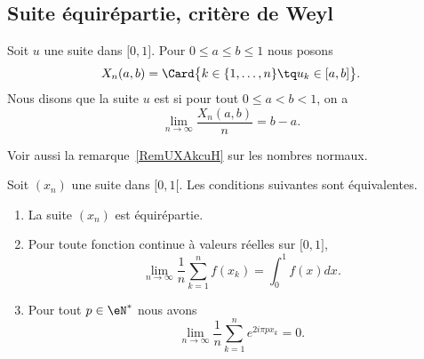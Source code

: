 \subsection{Suite équirépartie, critère de Weyl}

\begin{definition}
    Soit \( u\) une suite dans \( \mathopen[ 0 , 1 \mathclose]\). Pour \( 0\leq a\leq b\leq 1\) nous posons
    \begin{equation}
        X_n(a,b)=\Card\big\{  k\in\{ 1,\ldots, n \}\tq u_k\in\mathopen[ a , b \mathclose] \big\}.
    \end{equation}
    Nous disons que la suite \( u\) est  si pour tout \( 0\leq a<b<1\), on a
    \begin{equation}
        \lim_{n\to \infty} \frac{ X_n(a,b) }{ n }=b-a.
    \end{equation}
\end{definition}
Voir aussi la remarque~\ref{RemUXAkcuH} sur les nombres normaux.

\begin{proposition}  \label{PropDMvPDc}
    Soit \( (x_n)\) une suite dans \( \mathopen[ 0 , 1 [\). Les conditions suivantes sont équivalentes.
    \begin{enumerate}
        \item   \label{ItemKWcZTHqi}
            La suite \( (x_n)\) est équirépartie.
        \item\label{ItemKWcZTHqii}
            Pour toute fonction continue à valeurs réelles sur \( \mathopen[ 0 , 1 \mathclose]\),
            \begin{equation}    \label{EqBSqdjpn}
                \lim_{n\to \infty} \frac{1}{ n }\sum_{k=1}^nf(x_k)=\int_0^1f(x)dx.
            \end{equation}
        \item\label{ItemKWcZTHqiii}
            Pour tout \( p\in\eN^*\) nous avons
            \begin{equation}
                \lim_{n\to \infty} \frac{1}{ n }\sum_{k=1}^n e^{2i\pi px_k}=0.
            \end{equation}
    \end{enumerate}
\end{proposition}

